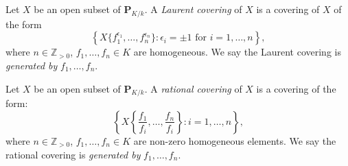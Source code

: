\begin{definition}
    Let $X$ be an open subset of $\mathbf{P}_{K/k}$. A \emph{Laurent covering} of $X$ is a covering of $X$ of the form 
    \[
        \left\{ X\{f_1^{\epsilon_1},\ldots,f_n^{\epsilon_n}\}:\epsilon_i=\pm 1\text{ for }i=1,\ldots,n \right\},
    \]
    where $n\in \mathbb{Z}_{>0}$, $f_1,\ldots,f_n\in K$ are homogeneous. We say the Laurent covering is \emph{generated by } $f_1,\ldots,f_n$.
\end{definition}
\begin{definition}
    Let $X$ be an open subset of $\mathbf{P}_{K/k}$. A \emph{rational covering} of $X$ is a covering of the form:
    \[
        \left\{ X\left\{\frac{f_1}{f_i},\ldots,\frac{f_n}{f_i} \right\}:i=1,\ldots,n  \right\},  
    \]
    where $n\in \mathbb{Z}_{>0}$, $f_1,\ldots,f_n\in K$ are non-zero homogeneous elements. We say the rational covering is \emph{generated by} $f_1,\ldots,f_n$.
\end{definition}


